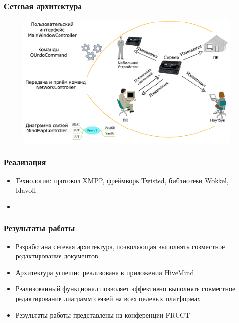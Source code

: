 \documentclass[unicode]{beamer}
\begin{document}
\begin{frame}
\transwipe[direction=90]
\frametitle{Сетевая архитектура}
\begin{figure}[h!] 
\centering
\includegraphics[width=\linewidth]{application-layers-improved} 
\end{figure}
\end{frame}

\begin{frame}
\transwipe[direction=90]
\frametitle{Реализация}
\begin{itemize}
  \item Технологии: протокол XMPP, фреймворк Twisted, библиотеки Wokkel, Idavoll
  \item 
\end{itemize}
\end{frame}

\begin{frame}
\transwipe[direction=90]
\frametitle{Результаты работы}
\begin{itemize}
  \item Разработана сетевая архитектура, позволяющая выполнять совместное
  редактирование документов
  \item Архитектура успешно реализована в приложении HiveMind
  \item Реализованный функционал позволяет эффективно выполнять совместное
  редактирование диаграмм связей на всех целевых платформах
  \item Результаты работы представлены на конференции FRUCT
\end{itemize}
\end{frame}
\end{document}
